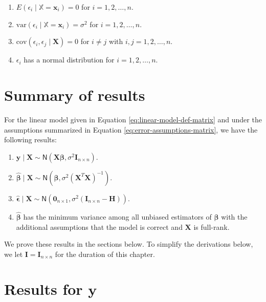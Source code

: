 \documentclass[
]{book}
\providecommand{\tightlist}{%
  \setlength{\itemsep}{0pt}\setlength{\parskip}{0pt}}
\theoremstyle{definition}
\theoremstyle{definition}
\theoremstyle{definition}
\theoremstyle{definition}
\theoremstyle{remark}
\begin{document}
\begin{enumerate}
\def\labelenumi{\arabic{enumi}.}
\tightlist
\item
  \(E(\epsilon_i \mid \mathbb{X}=\mathbf{x}_i)=0\) for \(i=1,2,\ldots,n\).
\item
  \(\mathrm{var}(\epsilon_i\mid \mathbb{X}=\mathbf{x}_i)=\sigma^2\) for \(i=1,2,\ldots,n\).
\item
  \(\mathrm{cov}(\epsilon_i,\epsilon_j\mid \mathbf{X})=0\) for \(i\neq j\) with \(i,j=1,2,\ldots,n\).
\item
  \(\epsilon_i\) has a normal distribution for \(i=1,2,\ldots,n\).
\end{enumerate}

\hypertarget{summary-of-results}{%
\section{Summary of results}\label{summary-of-results}}

For the linear model given in Equation \eqref{eq:linear-model-def-matrix} and under the assumptions summarized in Equation \eqref{eq:error-assumptions-matrix}, we have the following results:

\begin{enumerate}
\def\labelenumi{\arabic{enumi}.}
\tightlist
\item
  \(\mathbf{y}\mid \mathbf{X}\sim \mathsf{N}(\mathbf{X}\boldsymbol{\beta}, \sigma^2 \mathbf{I}_{n\times n})\).
\item
  \(\hat{\boldsymbol{\beta}}\mid \mathbf{X}\sim \mathsf{N}(\boldsymbol{\beta}, \sigma^2(\mathbf{X}^T\mathbf{X})^{-1})\).
\item
  \(\hat{\boldsymbol{\epsilon}}\mid \mathbf{X}\sim \mathsf{N}(\mathbf{0}_{n\times 1}, \sigma^2 (\mathbf{I}_{n\times n} - \mathbf{H}))\).
\item
  \(\hat{\boldsymbol{\beta}}\) has the minimum variance among all unbiased estimators of \(\boldsymbol{\beta}\) with the additional assumptions that the model is correct and \(\mathbf{X}\) is full-rank.
\end{enumerate}

We prove these results in the sections below. To simplify the derivations below, we let \(\mathbf{I}=\mathbf{I}_{n\times n}\) for the duration of this chapter.

\hypertarget{results-for-mathbfy}{%
\section{\texorpdfstring{Results for \(\mathbf{y}\)}{Results for \textbackslash mathbf\{y\}}}\label{results-for-mathbfy}}
\end{document}

